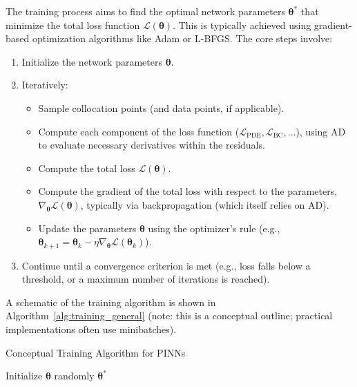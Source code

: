 The training process aims to find the optimal network parameters $\boldsymbol{\theta}^*$ that minimize the total loss function $\mathcal{L}(\boldsymbol{\theta})$. This is typically achieved using gradient-based optimization algorithms like Adam or L-BFGS. The core steps involve:
%
\begin{enumerate}
    \item Initialize the network parameters $\boldsymbol{\theta}$.
    \item Iteratively:
        \begin{itemize}
            \item Sample collocation points (and data points, if applicable).
            \item Compute each component of the loss function ($\mathcal{L}_{\text{PDE}}, \mathcal{L}_{\text{BC}}, \dots$), using AD to evaluate necessary derivatives within the residuals.
            \item Compute the total loss $\mathcal{L}(\boldsymbol{\theta})$.
            \item Compute the gradient of the total loss with respect to the parameters, $\nabla_{\boldsymbol{\theta}} \mathcal{L}(\boldsymbol{\theta})$, typically via backpropagation (which itself relies on AD).
            \item Update the parameters $\boldsymbol{\theta}$ using the optimizer's rule (e.g., $\boldsymbol{\theta}_{k+1} = \boldsymbol{\theta}_k - \eta \nabla_{\boldsymbol{\theta}} \mathcal{L}(\boldsymbol{\theta}_k)$).
        \end{itemize}
    \item Continue until a convergence criterion is met (e.g., loss falls below a threshold, or a maximum number of iterations is reached).
\end{enumerate}
%
A schematic of the training algorithm is shown in Algorithm~\ref{alg:training_general} (note: this is a conceptual outline; practical implementations often use minibatches).

\begin{algorithm}[H] %
\caption{Conceptual Training Algorithm for PINNs}
\label{alg:training_general}

Initialize $\boldsymbol{\theta}$ randomly\;
\Return $\boldsymbol{\theta}^*$
\end{algorithm}


